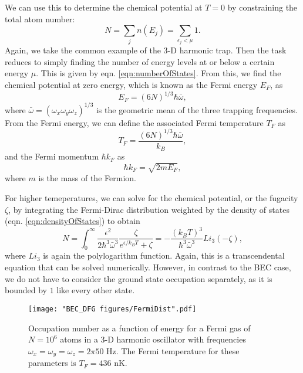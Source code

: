 We can use this to determine the chemical potential at $T=0$ by constraining the total atom number:
\begin{equation}
N=\sum_j n(E_j) = \sum_{\epsilon_j<\mu} 1.
\end{equation}
Again, we take the common example of the 3-D harmonic trap. Then the task reduces to simply finding the number of energy levels at or below a certain energy $\mu$. This is given by eqn. \ref{eqn:numberOfStates}. From this, we find the chemical potential at zero energy, which is known as the Fermi energy $E_F$, as
\begin{equation}
E_F = (6 N)^{1/3}\hbar\bar{\omega},
\end{equation}
where $\bar{\omega}=(\omega_x\omega_y\omega_z)^{1/3}$ is the geometric mean of the three trapping frequencies. From the Fermi energy, we can define the associated Fermi temperature $T_F$ as
\begin{equation}
T_F = \frac{(6 N)^{1/3}\hbar\bar{\omega}}{k_B},
\end{equation}
and the Fermi momentum $\hbar k_F$ as
\begin{equation}
\hbar k_F = \sqrt{2 m E_F},
\end{equation}
where $m$ is the mass of the Fermion. 

For higher temeperatures, we can solve for the chemical potential, or the fugacity $\zeta$, by integrating the Fermi-Dirac distribution weighted by the density of states (eqn. \ref{eqn:densityOfStates}) to obtain
\begin{equation}
N = \int_0^{\infty} \frac{\epsilon^2}{2\hbar^3 \bar{\omega}^3}\frac{\zeta}{e^{\epsilon/k_B T}+\zeta} = -\frac{(k_BT)^3}{\hbar^3 \bar{\omega}^3}Li_3(-\zeta),
\end{equation}
where $Li_3$ is again the polylogarithm function. Again, this is a transcendental equation that can be solved numerically. However, in contrast to the BEC case, we do not have to consider the ground state occupation separately, as it is bounded by $1$ like every other state. 

\begin{figure}
	\texttt{[image: "BEC\_DFG figures/FermiDist".pdf]}
\caption[Occupation number as a function of energy for a Fermi gas]{Occupation number as a function of energy for a Fermi gas of $N=10^6$ atoms in a 3-D harmonic oscillator with frequencies $\omega_x=\omega_y=\omega_z=2\pi 50$ Hz. The Fermi temperature for these parameters is $T_F=436$ nK.}
\label{fig:FermiDist}
\end{figure}


